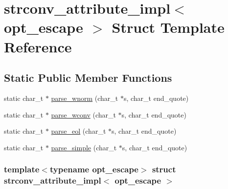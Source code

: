 \hypertarget{structstrconv__attribute__impl}{
\section{strconv\_\-attribute\_\-impl$<$ opt\_\-escape $>$ Struct Template Reference}
\label{structstrconv__attribute__impl}
}
\subsection*{Static Public Member Functions}
\begin{DoxyCompactItemize}
\item 
static char\_\-t $\ast$ \hyperlink{structstrconv__attribute__impl_a9b7f8b1e860c5d022dbd29f9a89e9e27}{parse\_\-wnorm} (char\_\-t $\ast$s, char\_\-t end\_\-quote)
\item 
static char\_\-t $\ast$ \hyperlink{structstrconv__attribute__impl_a2d39998b79896af7c53c5f3dc22a526b}{parse\_\-wconv} (char\_\-t $\ast$s, char\_\-t end\_\-quote)
\item 
static char\_\-t $\ast$ \hyperlink{structstrconv__attribute__impl_a0f57ee9d69b9d626765f4a9c8af6df2e}{parse\_\-eol} (char\_\-t $\ast$s, char\_\-t end\_\-quote)
\item 
static char\_\-t $\ast$ \hyperlink{structstrconv__attribute__impl_a8358dc980178e55c8669b9dcd04872d7}{parse\_\-simple} (char\_\-t $\ast$s, char\_\-t end\_\-quote)
\end{DoxyCompactItemize}
\subsubsection*{template$<$typename opt\_\-escape$>$ struct strconv\_\-attribute\_\-impl$<$ opt\_\-escape $>$}



